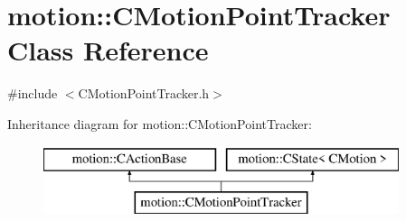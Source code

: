\hypertarget{classmotion_1_1CMotionPointTracker}{}\section{motion\+:\+:C\+Motion\+Point\+Tracker Class Reference}
\label{classmotion_1_1CMotionPointTracker}


{\ttfamily \#include $<$C\+Motion\+Point\+Tracker.\+h$>$}

Inheritance diagram for motion\+:\+:C\+Motion\+Point\+Tracker\+:\begin{figure}[H]
\begin{center}
\leavevmode
\includegraphics[height=2.000000cm]{classmotion_1_1CMotionPointTracker}
\end{center}
\end{figure}
